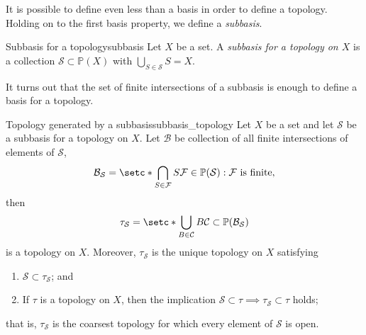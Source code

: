 It is possible to define even less than a basis in order to define a topology. Holding on to the first basis property, we define a \emph{subbasis}.
\begin{definition}{Subbasis for a topology}{subbasis}
    Let \(X\) be a set. A \emph{subbasis for a topology on \(X\)} is a collection \(\mathcal{S} \subset \mathbb{P}(X)\) with \(\bigcup_{S \in \mathcal{S}}{S} = X\).
\end{definition}

It turns out that the set of finite intersections of a subbasis is enough to define a basis for a topology.
\begin{proposition}{Topology generated by a subbasis}{subbasis_topology}
    Let \(X\) be a set and let \(\mathcal{S}\) be a subbasis for a topology on \(X\). Let \(\mathcal{B}\) be collection of all finite intersections of elements of \(\mathcal{S}\), 
    \begin{equation*}
        \mathcal{B}_{\mathcal{S}} = \setc*{\bigcap_{S \in \mathcal{F}}{S}}{\mathcal{F} \in \mathbb{P}(\mathcal{S}) : \mathcal{F}\text{ is finite}},
    \end{equation*}
    then 
    \begin{equation*}
        \tau_{\mathcal{S}} = \setc*{\bigcup_{B \in \mathcal{C}}{B}}{\mathcal{C} \subset \mathbb{P}(\mathcal{B}_{\mathcal{S}})}
    \end{equation*}
    is a topology on \(X\). Moreover, \(\tau_{\mathcal{S}}\) is the unique topology on \(X\) satisfying
    \begin{enumerate}[label=(\alph*)]
        \item \(\mathcal{S} \subset \tau_{\mathcal{S}}\); and
        \item If \(\tau\) is a topology on \(X\), then the implication \(\mathcal{S} \subset \tau \implies \tau_{\mathcal{S}} \subset \tau\) holds;
    \end{enumerate}
    that is, \(\tau_\mathcal{S}\) is the coarsest topology for which every element of \(\mathcal{S}\) is open.
\end{proposition}
